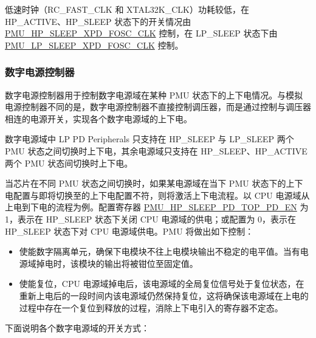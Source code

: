 \documentclass[main\_\_CN.tex]{subfiles}
\begin{document}
低速时钟（RC\_FAST\_CLK 和 XTAL32K\_CLK）功耗较低，在 HP\_ACTIVE、HP\_SLEEP 状态下的开关情况由 \hyperref[fielddesc:PMUHPSLEEPXPDFOSCCLK]{PMU\_HP\_SLEEP\_XPD\_FOSC\_CLK} 控制，在 LP\_SLEEP 状态下由 \hyperref[fielddesc:PMULPSLEEPXPDFOSCCLK]{PMU\_LP\_SLEEP\_XPD\_FOSC\_CLK} 控制。

\subsubsection{数字电源控制器}

数字电源控制器用于控制数字电源域在某种 PMU 状态下的上下电情况。与模拟电源控制器不同的是，数字电源控制器不直接控制调压器，而是通过控制与调压器相连的电源开关，实现各个数字电源域的上下电。

数字电源域中 LP PD Peripherals 只支持在 HP\_SLEEP 与 LP\_SLEEP 两个 PMU 状态之间切换时上下电，其余电源域只支持在 HP\_SLEEP、HP\_ACTIVE 两个 PMU 状态间切换时上下电。

当芯片在不同 PMU 状态之间切换时，如果某电源域在当下 PMU 状态下的上下电配置与即将切换至的上下电配置不符，则将激活上下电流程。以 CPU 电源域从上电到下电的流程为例。配置寄存器 \hyperref[fielddesc:PMUHPSLEEPPDTOPPDEN]{PMU\_HP\_SLEEP\_PD\_TOP\_PD\_EN} 为 1，表示在 HP\_SLEEP 状态下关闭 CPU 电源域的供电；或配置为 0，表示在 HP\_SLEEP 状态下对 CPU 电源域供电。PMU 将做出如下控制：

\begin{itemize}

\item 使能数字隔离单元，确保下电模块不往上电模块输出不稳定的电平值。当有电源域掉电时，该模块的输出将被钳位至固定值。

\item 使能复位，CPU 电源域掉电后，该电源域的全局复位信号处于复位状态，在重新上电后的一段时间内该电源域仍然保持复位，这将确保该电源域在上电的过程中存在一个复位到释放的过程，消除上下电引入的寄存器不定态。

\end{itemize}

下面说明各个数字电源域的开关方式：
\end{document}
